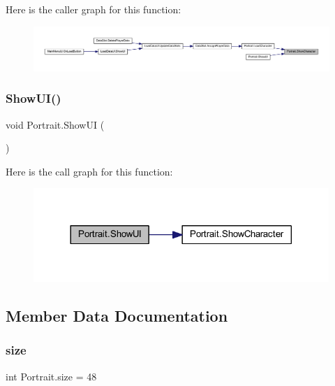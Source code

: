 Here is the caller graph for this function\+:
\nopagebreak
\begin{figure}[H]
\begin{center}
\leavevmode
\includegraphics[width=350pt]{class_portrait_ab8365d52d39bacdb043a5f707e9c17ef_icgraph}
\end{center}
\end{figure}
\mbox{\label{class_portrait_a5469fe5b40d6ac458f87f2748cb0805c}} 
\subsubsection{\texorpdfstring{ShowUI()}{ShowUI()}}
{\footnotesize\ttfamily void Portrait.\+Show\+UI (\begin{DoxyParamCaption}{ }\end{DoxyParamCaption})}

Here is the call graph for this function\+:
\nopagebreak
\begin{figure}[H]
\begin{center}
\leavevmode
\includegraphics[width=317pt]{class_portrait_a5469fe5b40d6ac458f87f2748cb0805c_cgraph}
\end{center}
\end{figure}


\subsection{Member Data Documentation}
\mbox{\label{class_portrait_ac8488582e058dc2d20b8f2e5bdfbe427}} 
\subsubsection{\texorpdfstring{size}{size}}
{\footnotesize\ttfamily int Portrait.\+size = 48\hspace{0.3cm}{\ttfamily [static]}}



